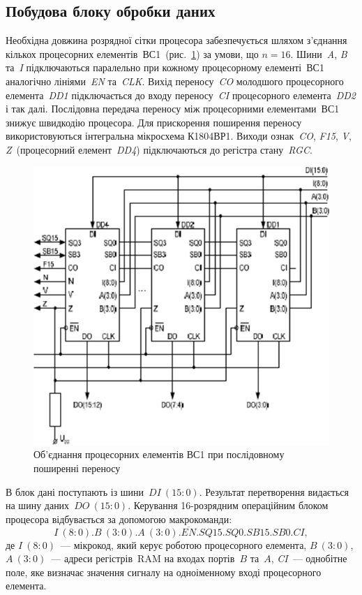 \documentclass[a4paper,oneside,DIV=12,12pt,headings=normal]{scrartcl}
\newcommand{\allcaps}[1]{{\addfontfeatures{LetterSpace = 3}#1}}
\newcommand{\schel}[1]{\textit{#1}}
\newcommand{\addrinterval}[2]{(#1{:}#2)}
\begin{document}
			\subsection{Побудова блоку обробки даних}
				Необхідна довжина розрядної сітки процесора забезпечується шляхом з'єднання кількох процесорних елементів~ВС1~(рис.~\ref{fig:vs1-cascade}) за умови, що $n = 16$. Шини~\schel{A}, \schel{B} та~\schel{I} підключаються паралельно при кожному процесорному елементі~ВС1 аналогічно лініями~\schel{EN} та~\schel{CLK}. Вихід переносу~\schel{CO} молодшого процесорного елемента~\schel{DD1} підключається до входу переносу~\schel{CI} процесорного елемента~\schel{DD2} і так далі. Послідовна передача переносу між процесорними елементами~ВС1 знижує швидкодію процесора. Для прискорення поширення переносу використовуються інтегральна мікросхема К1804ВР1. Виходи ознак~\schel{CO}, \schel{F15}, \schel{V}, \schel{Z}~(процесорний елемент~\schel{DD4}) підключаються до регістра стану~\schel{RGC}.
				\begin{figure}[!htbp]
					\centering
					\includegraphics[height = 15\baselineskip]{./assets/03-vs1-cascade.png}
					\caption{Об'єднання процесорних елементів ВС1 при послідовному поширенні переносу}
					\label{fig:vs1-cascade}
				\end{figure}

				В блок дані поступають із шини~$\schel{DI}~\addrinterval{15}{0}$. Результат перетворення видається на шину даних~$\schel{DO}~\addrinterval{15}{0}$. Керування 16-розрядним операційним блоком процесора відбувається за допомогою макрокоманди:
				\begin{equation*}
					I~\addrinterval{8}{0}.B~\addrinterval{3}{0}.A~\addrinterval{3}{0}.\overline{EN}.\schel{SQ15}.\schel{SQ0}.\schel{SB15}.\schel{SB0}.\schel{CI},
				\end{equation*}
				де $I~\addrinterval{8}{0}$~— мікрокод, який керує роботою процесорного елемента, $B~\addrinterval{3}{0}$, $A~\addrinterval{3}{0}$~— адреси регістрів~\allcaps{RAM} на входах портів~$B$ та~$A$, \schel{CI}~— однобітне поле, яке визначає значення сигналу на одноіменному вході процесорного елемента.
\end{document}
